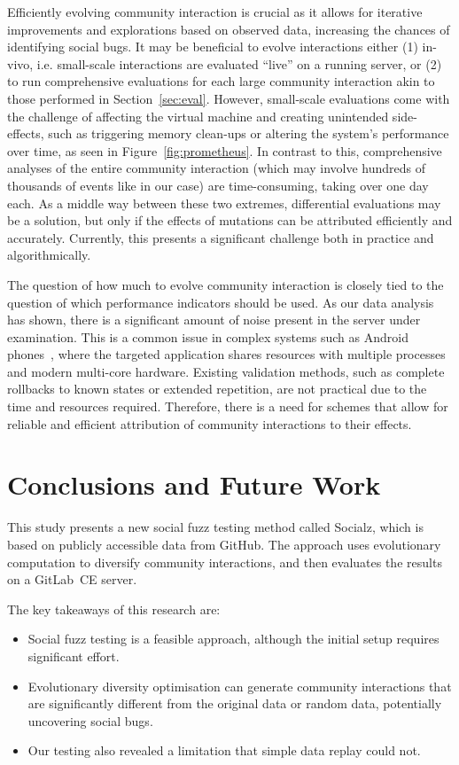 \documentclass[dvipsnames,format=sigconf,anonymous=False,review=false, balance=false]{acmart}
\begin{document}
Efficiently evolving community interaction is crucial as it allows for iterative improvements and explorations based on observed data, increasing the chances of identifying social bugs. 
It may be beneficial to evolve interactions either 
(1) in-vivo, i.e. small-scale interactions are evaluated ``live'' on a running server, or 
(2) to run comprehensive evaluations for each large community interaction akin to those performed in Section~\ref{sec:eval}. 
However, small-scale evaluations come with the challenge of affecting the virtual machine and creating unintended side-effects, such as triggering memory clean-ups or altering the system's performance over time, as seen in Figure~\ref{fig:prometheus}. 
In contrast to this, comprehensive analyses of the entire community interaction (which may involve hundreds of thousands of events like in our case) are time-consuming, taking over one day each. 
As a middle way between these two extremes, differential evaluations may be a solution, but only if the effects of mutations can be attributed efficiently and accurately. Currently, this presents a significant challenge both in practice and algorithmically.

The question of how much to evolve community interaction is closely tied to the question of which performance indicators should be used. As our data analysis has shown, there is a significant amount of noise present in the server under examination. This is a common issue in complex systems such as Android phones~\cite{bokhari2020validation}, where the targeted application shares resources with multiple processes and modern multi-core hardware. Existing validation methods, such as complete rollbacks to known states or extended repetition, are not practical due to the time and resources required. Therefore, there is a need for schemes that allow for reliable and efficient attribution of community interactions to their effects.

\section{Conclusions and Future Work}

This study presents a new social fuzz testing method called Socialz, which is based on publicly accessible data from GitHub. The approach uses evolutionary computation to diversify community interactions, and then evaluates the results on a GitLab~CE server.

The key takeaways of this research are: 
\begin{itemize}
    \item Social fuzz testing is a feasible approach, although the initial setup requires significant effort. 
    \item Evolutionary diversity optimisation can generate community interactions that are significantly different from the original data or random data, potentially uncovering social bugs. 
    \item Our testing also revealed a limitation that simple data replay could not.
\end{itemize}
\end{document}
